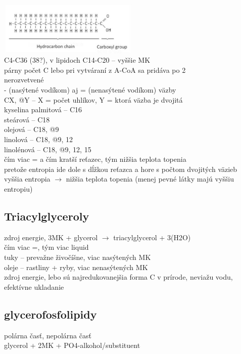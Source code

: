 \includegraphics[width=0.5\textwidth]{images/biochemia/fatty_acid}
\\
C4-C36 (38?), v lipidoch C14-C20 -- vyššie MK\\
párny počet C lebo pri vytváraní z A-CoA sa pridáva po 2\\
nerozvetvené\\
- (nasýtené vodíkom) aj = (nenasýtené vodíkom) väzby\\
CX, @Y -- X = počet uhlíkov, Y = ktorá väzba je dvojitá\\
\tab kyselina palmitová -- C16\\
\tab steárová -- C18\\
\tab olejová -- C18, @9\\
\tab linolová -- C18, @9, 12 \\
\tab linolénová -- C18, @9, 12, 15\\
čím viac = a čím kratší reťazec, tým nižšia teplota topenia\\
\tab pretože entropia ide dole s dĺžkou reťazca a hore s počtom dvojitých väzieb\\
\tab vyššia entropia $\rightarrow$ nižšia teplota topenia (menej pevné látky majú vyššiu entropiu)\\
\subsection{Triacylglyceroly}
zdroj energie, 3MK + glycerol $\rightarrow$ triacylglycerol + 3(H2O)\\
čím viac =, tým viac liquid\\
tuky -- prevažne živočíšne, viac nasýtených MK\\
oleje -- rastliny + ryby, viac nenasýtených MK\\
zdroj energie, lebo sú najredukovanejšia forma C v prírode, neviažu vodu, efektívne ukladanie\\
\subsection{glycerofosfolipidy}
polárna časť, nepolárna časť\\
glycerol + 2MK + PO4-alkohol/substituent\\

